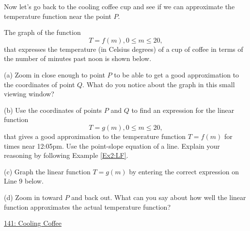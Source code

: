 \documentclass{ximera}
\begin{document}
Now let's go back to the cooling coffee cup and see if we can approximate the temperature function near the point $P$.

\begin{question} \label{Ex3:LF} The graph of the function
\[
    T = f(m) , 0\leq m \leq 20 ,
\]
that expresses the temperature (in Celsius degrees) of a cup of coffee in terms of the number of minutes past noon is shown below. 

(a) Zoom in close enough to point $P$ to be able to get a good approximation to the coordinates of point $Q$. What do you notice about the graph in this small viewing window?

(b) Use the coordinates of points $P$ and $Q$ to find an expression for the linear function 
\[
  T = g(m) , 0\leq m \leq 20,
\]
that gives a good approximation to the temperature function $T=f(m)$ for times near 12:05pm. Use the point-slope equation of a line. Explain your reasoning by following Example \ref{Ex2:LF}.

(c) Graph the linear function $T=g(m)$ by entering the correct expression on Line 9 below.

(d) Zoom in toward $P$ and back out. What can you say about how well the linear function approximates the actual temperature function?

 
\begin{onlineOnly}
    \begin{center}
\end{center}
\end{onlineOnly}

\href{https://www.desmos.com/calculator/vce8fcabt7}{141: Cooling Coffee}

\end{question} 
\end{document}

